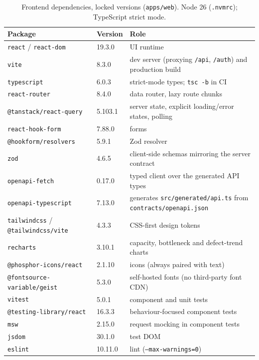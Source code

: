 \documentclass[11pt,a4paper]{article}
\begin{document}
\begin{table}[h]
\centering\small
\caption{Frontend dependencies, locked versions (\texttt{apps/web}). Node 26
(\texttt{.nvmrc}); TypeScript strict mode.}
\begin{tabular}{@{}llL{7.2cm}@{}}
\toprule
\textbf{Package} & \textbf{Version} & \textbf{Role}\\
\midrule
\texttt{react} / \texttt{react-dom} & 19.3.0 & UI runtime\\
\texttt{vite}              & 8.3.0   & dev server (proxying \texttt{/api}, \texttt{/auth}) and production build\\
\texttt{typescript}        & 6.0.3   & strict-mode types; \texttt{tsc -b} in CI\\
\texttt{react-router}      & 8.4.0   & data router, lazy route chunks\\
\texttt{@tanstack/react-query} & 5.103.1 & server state, explicit loading/error states, polling\\
\texttt{react-hook-form}   & 7.88.0  & forms\\
\texttt{@hookform/resolvers} & 5.9.1 & Zod resolver\\
\texttt{zod}               & 4.6.5   & client-side schemas mirroring the server contract\\
\texttt{openapi-fetch}     & 0.17.0  & typed client over the generated API types\\
\texttt{openapi-typescript}& 7.13.0  & generates \texttt{src/generated/api.ts} from \texttt{contracts/openapi.json}\\
\texttt{tailwindcss} / \texttt{@tailwindcss/vite} & 4.3.3 & CSS-first design tokens\\
\texttt{recharts}          & 3.10.1  & capacity, bottleneck and defect-trend charts\\
\texttt{@phosphor-icons/react} & 2.1.10 & icons (always paired with text)\\
\texttt{@fontsource-variable/geist} & 5.3.0 & self-hosted fonts (no third-party font CDN)\\
\texttt{vitest}            & 5.0.1   & component and unit tests\\
\texttt{@testing-library/react} & 16.3.3 & behaviour-focused component tests\\
\texttt{msw}               & 2.15.0  & request mocking in component tests\\
\texttt{jsdom}             & 30.1.0  & test DOM\\
\texttt{eslint}            & 10.11.0 & lint (\texttt{--max-warnings=0})\\
\bottomrule
\end{tabular}
\end{table}
\end{document}
